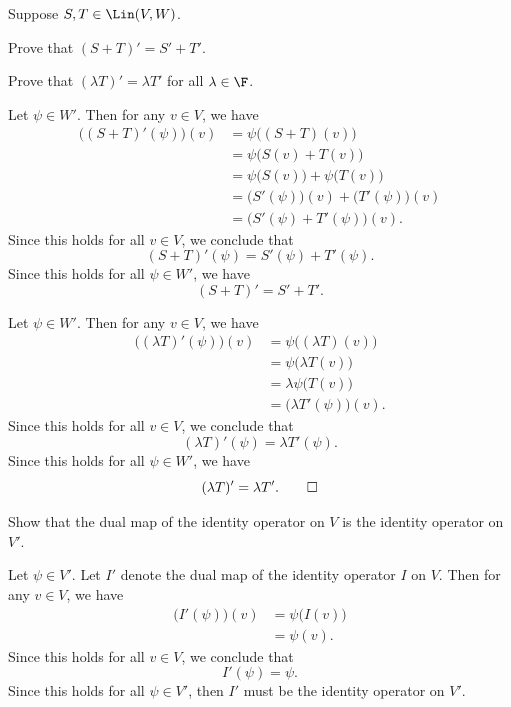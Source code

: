 \begin{exc}
\begin{exercise}
Suppose $S,T\in\Lin(V,W)$.
\begin{parts}
\item Prove that $(S+T)'=S'+T'$.
\item Prove that $(\lambda T)'=\lambda T'$ for all $\lambda\in\F$.
\end{parts}
\end{exercise}
\begin{solution}\leavevmode
\begin{parts}
\item Let $\psi\in W'$. Then for any $v\in V$, we have
  \begin{align*}
  \bigl((S+T)'(\psi)\bigr)(v) &= \psi\bigl((S+T)(v)\bigr)\\
   &= \psi\bigl(S(v)+T(v)\bigr)\\
   &= \psi\bigl(S(v)\bigr)+\psi\bigl(T(v)\bigr)\\
   &= \bigl(S'(\psi)\bigr)(v)+\bigl(T'(\psi)\bigr)(v)\\
   &= \bigl(S'(\psi)+T'(\psi)\bigr)(v).
  \end{align*}
  Since this holds for all $v\in V$, we conclude that
  \[ (S+T)'(\psi) = S'(\psi)+T'(\psi). \]
  Since this holds for all $\psi\in W'$, we have
  \[ (S+T)' = S'+T'. \]
\item Let $\psi\in W'$. Then for any $v\in V$, we have
  \begin{align*}
  \bigl((\lambda T)'(\psi)\bigr)(v) &= \psi\bigl((\lambda T)(v)\bigr)\\
   &= \psi\bigl(\lambda T(v)\bigr)\\
   &= \lambda\psi\bigl(T(v)\bigr)\\
   &= \bigl(\lambda T'(\psi)\bigr)(v).
  \end{align*}
  Since this holds for all $v\in V$, we conclude that
  \[ (\lambda T)'(\psi) = \lambda T'(\psi). \]
  Since this holds for all $\psi\in W'$, we have
  \[ (\lambda T)' = \lambda T'. \qedhere \]
\end{parts}
\end{solution}

\begin{exercise}
Show that the dual map of the identity operator on $V$ is the identity operator
on $V'$.
\end{exercise}
\begin{solution}
Let $\psi\in V'$. Let $I'$ denote the dual map of the identity operator $I$ on
$V$. Then for any $v\in V$, we have
\begin{align*}
\bigl(I'(\psi)\bigr)(v) &= \psi\bigl(I(v)\bigr)\\
 &= \psi(v).
\end{align*}
Since this holds for all $v\in V$, we conclude that
\[ I'(\psi) = \psi. \]
Since this holds for all $\psi\in V'$, then $I'$ must be the identity operator
on $V'$.
\end{solution}


\end{exc}
